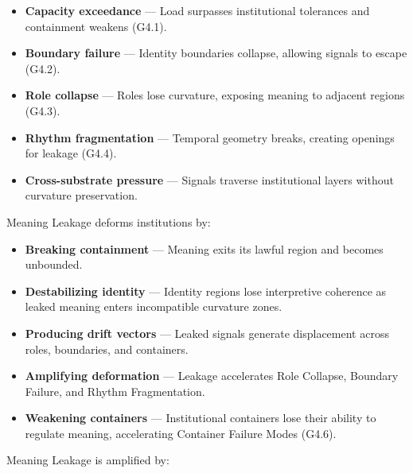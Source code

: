 \begin{itemize}[leftmargin=1.2cm]
    \item \textbf{Capacity exceedance} — Load surpasses institutional tolerances
    and containment weakens (G4.1).

    \item \textbf{Boundary failure} — Identity boundaries collapse, allowing
    signals to escape (G4.2).

    \item \textbf{Role collapse} — Roles lose curvature, exposing meaning to
    adjacent regions (G4.3).

    \item \textbf{Rhythm fragmentation} — Temporal geometry breaks, creating
    openings for leakage (G4.4).

    \item \textbf{Cross-substrate pressure} — Signals traverse institutional
    layers without curvature preservation.
\end{itemize}

\medskip

\noindent Meaning Leakage deforms institutions by:

\begin{itemize}[leftmargin=1.2cm]
    \item \textbf{Breaking containment} — Meaning exits its lawful region and
    becomes unbounded.

    \item \textbf{Destabilizing identity} — Identity regions lose interpretive
    coherence as leaked meaning enters incompatible curvature zones.

    \item \textbf{Producing drift vectors} — Leaked signals generate displacement
    across roles, boundaries, and containers.

    \item \textbf{Amplifying deformation} — Leakage accelerates Role Collapse,
    Boundary Failure, and Rhythm Fragmentation.

    \item \textbf{Weakening containers} — Institutional containers lose their
    ability to regulate meaning, accelerating Container Failure Modes (G4.6).
\end{itemize}

\medskip

\noindent Meaning Leakage is amplified by:

